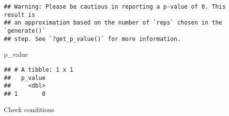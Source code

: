 \documentclass[]{article}
\newenvironment{Shaded}{\begin{snugshade}}{\end{snugshade}}
\newcommand{\NormalTok}[1]{#1}
\begin{document}
\begin{verbatim}
## Warning: Please be cautious in reporting a p-value of 0. This result is
## an approximation based on the number of `reps` chosen in the `generate()`
## step. See `?get_p_value()` for more information.
\end{verbatim}

\begin{Shaded}
\begin{Highlighting}[]
\NormalTok{p_value}
\end{Highlighting}
\end{Shaded}

\begin{verbatim}
## # A tibble: 1 x 1
##   p_value
##     <dbl>
## 1       0
\end{verbatim}

Check conditions
\end{document}
